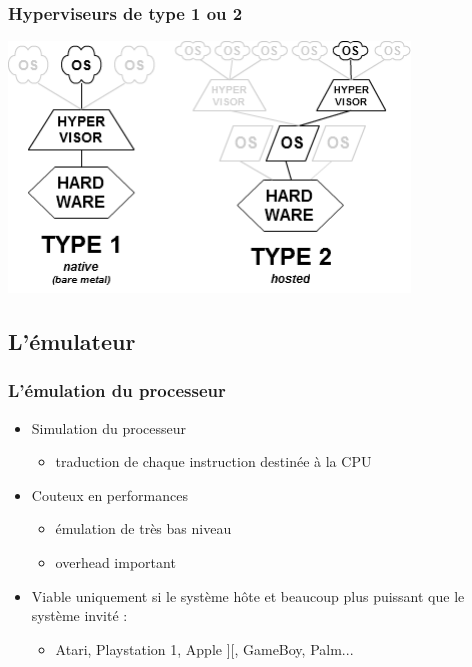 \begin{frame}
\frametitle{Hyperviseurs de type 1 ou 2}
\includegraphics[width=0.8\textwidth]{../illustration/Hyperviseur.png}
\end{frame}


\subsection{L'émulateur}	

\begin{frame}
\frametitle{L’émulation du processeur}
\begin{itemize}
\item Simulation du processeur
\begin{itemize}
\item traduction de chaque instruction destinée à la CPU
\end{itemize}
\item Couteux en performances
\begin{itemize}
  \item émulation de très bas niveau
  \item overhead important
\end{itemize}
\item Viable uniquement si le système hôte et beaucoup plus puissant que le système invité :
\begin{itemize}
\item Atari, Playstation 1, Apple ][, GameBoy, Palm...
\end{itemize}
\end{itemize}
\end{frame}

